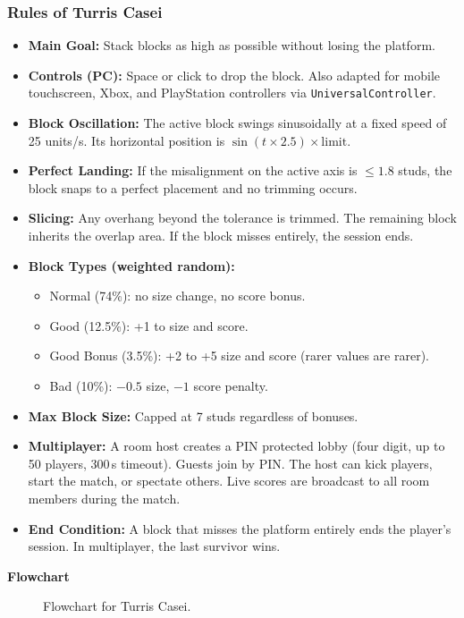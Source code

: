 \documentclass[12pt,letterpaper]{article}
\begin{document}
\subsubsection{Rules of Turris Casei}
\begin{itemize}
  \item \textbf{Main Goal:} Stack blocks as high as possible without losing the platform.
  \item \textbf{Controls (PC):} Space or click to drop the block. Also adapted for mobile touchscreen, Xbox, and PlayStation controllers via \texttt{UniversalController}.
  \item \textbf{Block Oscillation:} The active block swings sinusoidally at a fixed speed of 25 units/s. Its horizontal position is $\sin(t \times 2.5) \times \text{limit}$.
  \item \textbf{Perfect Landing:} If the misalignment on the active axis is $\leq 1.8$ studs, the block snaps to a perfect placement and no trimming occurs.
  \item \textbf{Slicing:} Any overhang beyond the tolerance is trimmed. The remaining block inherits the overlap area. If the block misses entirely, the session ends.
  \item \textbf{Block Types (weighted random):}
  \begin{itemize}
    \item Normal (74\%): no size change, no score bonus.
    \item Good (12.5\%): +1 to size and score.
    \item Good Bonus (3.5\%): +2 to +5 size and score (rarer values are rarer).
    \item Bad (10\%): $-0.5$ size, $-1$ score penalty.
  \end{itemize}
  \item \textbf{Max Block Size:} Capped at 7 studs regardless of bonuses.
  \item \textbf{Multiplayer:} A room host creates a PIN protected lobby (four digit, up to 50 players, 300\,s timeout). Guests join by PIN. The host can kick players, start the match, or spectate others. Live scores are broadcast to all room members during the match.
  \item \textbf{End Condition:} A block that misses the platform entirely ends the player's session. In multiplayer, the last survivor wins.
\end{itemize}

\textbf{Flowchart}
\begin{figure}[H]
  \centering
  
  \caption{Flowchart for Turris Casei.}
  \label{fig:turriscasei_flow}
\end{figure}
\end{document}
